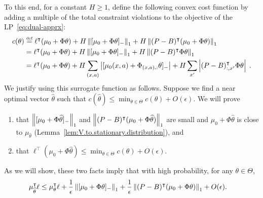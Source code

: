 \documentclass[11pt]{article}
\newcommand{\df}{\stackrel{\mbox{\rm\tiny def}}{=}}
\begin{document}
  To this end, for a constant $H\geq 1$, define the following convex cost function by adding a multiple of the total constraint violations to the objective of the LP~\eqref{eq:dual-apprx}:
\begin{equation}\label{eq:objective_function}
\begin{split}	
c(\theta) &\df \ell^\top (\mu_0 + \Phi \theta) + H \norm{[\mu_0 + \Phi\theta]_{-}}_1 + H \norm{(P - B)^\top (\mu_0 + \Phi\theta)}_1 \\
&= \ell^\top (\mu_0 + \Phi \theta) + H \norm{[\mu_0 + \Phi\theta]_{-}}_1+ H \norm{(P - B)^\top \Phi\theta}_1 \\
&= \ell^\top (\mu_0 + \Phi \theta) + H \sum_{(x,a)} \abs{ [\mu_0(x,a) + \Phi_{(x,a),:}\theta]_{-}}
+ H \sum_{x'} \abs{(P - B)_{:,x'}^\top \Phi \theta} \; .
\end{split}
\end{equation}
We justify using this surrogate function as follows. Suppose we find a near optimal vector $\widehat \theta$ such that $c(\widehat \theta) \le \min_{\theta\in\Theta} c(\theta) + O(\epsilon)$. We will prove
\begin{enumerate}
\item that $\left\Vert[\mu_0 + \Phi\widehat\theta]_{-}\right\Vert_1$ and $\left\Vert(P -
B)^\intercal (\mu_0 + \Phi\widehat\theta)\right\Vert_1$ are small and $\mu_0 + \Phi\widehat\theta$ is close to $\mu_{\widehat\theta}$
(Lemma~\ref{lem:V.to.stationary.distribution}), and
\item that $\ell^\top (\mu_0 + \Phi \widehat\theta) \le \min_{\theta\in\Theta} c(\theta) + O(\epsilon)$.
\end{enumerate}
As we will show, these two facts imply that with high probability, for any $\theta\in\Theta$,
\begin{align*}
\mu_{\widehat\theta}^\intercal \ell \le \mu_\theta^\intercal \ell &+ \frac{1}{\epsilon}  \left\Vert[\mu_0 + \Phi\theta]_{-}\right\Vert_1+ \frac{1}{\epsilon} \left\Vert(P - B)^\intercal (\mu_0 + \Phi\theta)\right\Vert_1 + O(\epsilon).
\end{align*}
\end{document}
